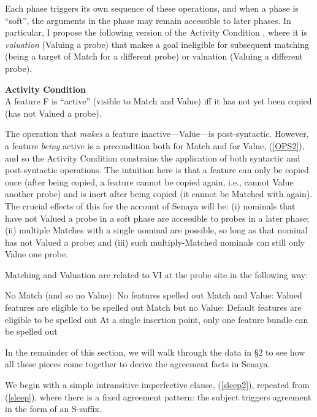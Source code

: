 \documentclass[output=paper
,modfonts
,nonflat]{langsci/langscibook}
\begin{document}
\noindent Each phase triggers its own sequence of these operations, and when a phase is ``soft'', the arguments in the phase may remain accessible to later phases. In particular, I propose the following version of the Activity Condition \citep{Chomsky01}, where it is \textit{valuation} (Valuing a probe) that makes a goal ineligible for subsequent matching (being a target of Match for a different probe) or valuation (Valuing a different probe).

\ea \textbf{Activity Condition}\\A feature F is ``active'' (visible to Match and Value) iff it has not yet been copied (has not Valued a probe).\label{AC2}
\z

\noindent The operation that \textit{makes} a feature inactive---Value---is post-syntactic. However, a feature \textit{being} active is a precondition both for Match and for Value, (\ref{OPS2}), and so the Activity Condition constrains the application of both syntactic and post-syntactic operations. The intuition here is that a feature can only be copied once \citep{Bejar03} (after being copied, a feature cannot be copied again, i.e., cannot Value another probe) and is inert after being copied (it cannot be Matched with again). The crucial effects of this for the account of Senaya will be: (i) nominals that have not Valued a probe in a soft phase are accessible to probes in a later phase; (ii) multiple Matches with a single nominal are possible, so long as that nominal has not Valued a probe; and (iii) such multiply-Matched nominals can still only Value one probe.

Matching and Valuation are related to VI at the probe site in the following way: 

\eal
\ex No Match (and so no Value): No features spelled out\footnotemark
\ex Match and Value: Valued features are eligible to be spelled out
\ex Match but no Value: Default features are eligible to be spelled out
\ex At a single insertion point, only one feature bundle can be spelled out
\zl 


\noindent In the remainder of this section, we will walk through the data in \S2 to see how all these pieces come together to derive the agreement facts in Senaya. 

We begin with a simple intransitive imperfective clause, (\ref{sleep2}), repeated from (\ref{sleep}), where there is a fixed agreement pattern: the subject triggers agreement in the form of an S-suffix.
\end{document}
